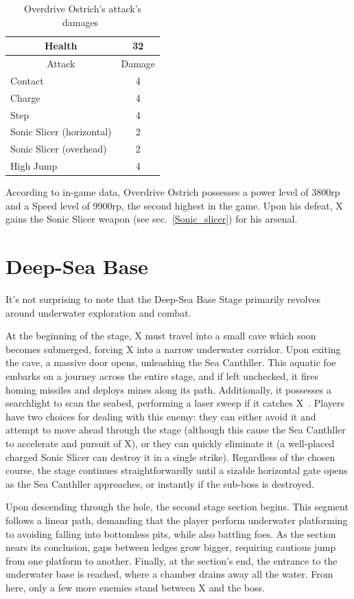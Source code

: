\begin{table}[htp]
	\centering
	\begin{tabular}[h]{l c}
		\toprule
		\multicolumn{1}{c}{Health}  & 32 \\
		\midrule
		\multicolumn{1}{c}{Attack} & \multicolumn{1}{c}{Damage}\\
		Contact & 4 \\
		Charge & 4\\
		Step& 4\\
		Sonic Slicer (horizontal) & 2\\
		Sonic Slicer (overhead) & 2\\
		High Jump & 4\\
		\bottomrule
	\end{tabular}
	\caption{Overdrive Ostrich's attack's damages~\cite{wiki:Overdrive_Ostrich,book:Compendium}}
\end{table}
According to in-game data, Overdrive Ostrich possesses a power level of 3800rp and a Speed level of 9900rp, the second highest in the game. Upon his defeat, X gains the Sonic Slicer weapon (see sec.~\ref{Sonic_slicer}) for his arsenal.

\section{Deep-Sea Base}
It's not surprising to note that the Deep-Sea Base Stage primarily revolves around underwater exploration and combat.

At the beginning of the stage, X must travel into a small cave which soon becomes submerged, forcing X into a narrow underwater corridor. Upon exiting the cave, a massive door opens, unleashing the Sea Canthller. This aquatic foe embarks on a journey across the entire stage, and if left unchecked, it fires homing missiles and deploys mines along its path. Additionally, it possesses a searchlight to scan the seabed, performing a laser sweep if it catches X~\cite{wiki:Sea_Canthller}. Players have two choices for dealing with this enemy: they can either avoid it and attempt to move ahead through the stage (although this cause the Sea Canthller to accelerate and pursuit of X), or they can quickly eliminate it (a well-placed charged Sonic Slicer can destroy it in a single strike). Regardless of the chosen course, the stage continues straightforwardly until a sizable horizontal gate opens as the Sea Canthller approaches, or instantly if the sub-boss is destroyed.

Upon descending through the hole, the second stage section begins. This segment follows a linear path, demanding that the player perform underwater platforming to avoiding falling into bottomless pits, while also battling foes. As the section nears its conclusion, gaps between ledges grow bigger, requiring  cautious jump from one platform to another. Finally, at the section's end, the entrance to the underwater base is reached, where a chamber drains away all the water. From here, only a few more enemies stand between X and the boss.

